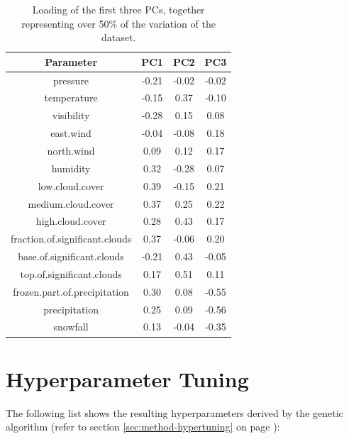 \begin{table}[H]
	\centering
	\begin{tabular}{|c|c|c|c|}
		\hline
		\textbf{Parameter} & \textbf{PC1} & \textbf{PC2} & \textbf{PC3} \\
		\hline \hline
		pressure                       & -0.21 & -0.02 & -0.02 \\
		\hline
		temperature                    & -0.15 &  0.37 & -0.10 \\
		\hline
		visibility                     & -0.28 &  0.15 &  0.08 \\
		\hline
		east.wind                      & -0.04 & -0.08 &  0.18 \\
		\hline
		north.wind                     &  0.09 &  0.12 &  0.17 \\
		\hline
		humidity                       &  0.32 & -0.28 &  0.07 \\
		\hline
		low.cloud.cover                &  0.39 & -0.15 &  0.21 \\
		\hline
		medium.cloud.cover             &  0.37 &  0.25 &  0.22 \\
		\hline
		high.cloud.cover               &  0.28 &  0.43 &  0.17 \\
		\hline
		fraction.of.significant.clouds &  0.37 & -0.06 &  0.20 \\
		\hline
		base.of.significant.clouds     & -0.21 &  0.43 & -0.05 \\
		\hline
		top.of.significant.clouds      &  0.17 &  0.51 &  0.11 \\
		\hline
		frozen.part.of.precipitation   &  0.30 &  0.08 & -0.55 \\
		\hline
		precipitation                  &  0.25 &  0.09 & -0.56 \\
		\hline
		snowfall                       &  0.13 & -0.04 & -0.35 \\
		\hline
	\end{tabular}
	\caption{Loading of the first three PCs, together representing over 50\% of the variation of the dataset.}
	\label{tbl:pcx}
\end{table}

\newpage
\section{Hyperparameter Tuning}
\label{sec:analysis-hyperparameters}

The following list shows the resulting hyperparameters derived by the genetic algorithm (refer to section \ref{sec:method-hypertuning} on page \pageref{sec:method-hypertuning}):

